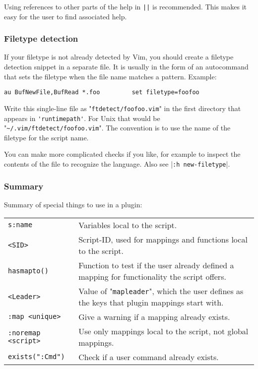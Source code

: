 Using references to other parts of the help in \verb!||! is recommended.
This makes it easy for the user to find associated help.
\subsubsection{Filetype detection}
\label{plugin-filetype}
If your filetype is not already detected by Vim, you should create a filetype detection snippet in a separate file.
It is usually in the form of an autocommand that sets the filetype when the file name matches a pattern.
Example:

\begin{Verbatim}[samepage=true]
 au BufNewFile,BufRead *.foo         set filetype=foofoo
\end{Verbatim}

Write this single-line file as "\verb!ftdetect/foofoo.vim!" in the first directory that appears in \verb!'runtimepath'!.
For Unix that would be "\verb!~/.vim/ftdetect/foofoo.vim!".
The convention is to use the name of the filetype for the script name.

You can make more complicated checks if you like, for example to inspect the contents of the file to recognize the language.
Also see |\verb!:h new-filetype!|.
\subsubsection{Summary}
\label{plugin-special}

Summary of special things to use in a plugin:
\begin{center} \begin{tabular}{l l}
				\verb!s:name! & Variables local to the script. \\
				\verb!<SID>! & Script-ID, used for mappings and functions local to the script. \\
				\verb!hasmapto()! & Function to test if the user already defined a mapping for functionality the script offers. \\
				\verb!<Leader>! & Value of "\verb!mapleader!", which the user defines as the keys that plugin mappings start with. \\
				\verb!:map <unique>! & Give a warning if a mapping already exists. \\
				\verb!:noremap <script>! & Use only mappings local to the script, not global mappings. \\
				\verb!exists(":Cmd")! & Check if a user command already exists. \\
\end{tabular} \end{center}
